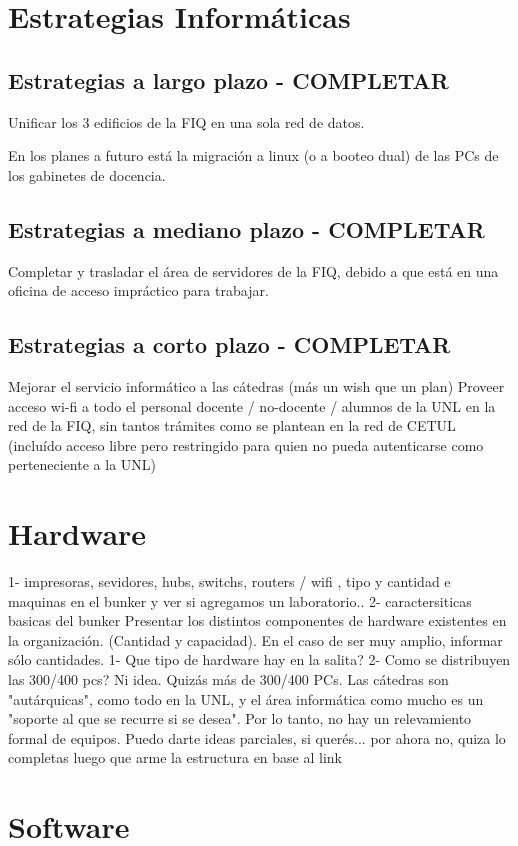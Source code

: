 \documentclass[10pt,a4paper,final]{article}
\begin{document}
\section{Estrategias Informáticas}
\subsection{Estrategias a largo plazo - COMPLETAR}
Unificar los 3 edificios de la FIQ en una sola red de datos.

En los planes a futuro está la migración a linux (o a booteo dual) de las PCs de los gabinetes de docencia.
\subsection{Estrategias a mediano plazo - COMPLETAR}
Completar y trasladar el área de servidores de la FIQ, debido a que está en una oficina de acceso impráctico para trabajar.
\subsection{Estrategias a corto plazo - COMPLETAR}
Mejorar el servicio informático a las cátedras (más un wish que un plan)
Proveer acceso wi-fi a todo el personal docente / no-docente / alumnos de la UNL en la red de la FIQ, sin tantos trámites como se plantean en la red de CETUL (incluído acceso libre pero restringido para quien no pueda autenticarse como perteneciente a la UNL)

\section{Hardware}
1- impresoras, sevidores, hubs, switchs, routers / wifi , tipo y cantidad e maquinas en el bunker y ver si agregamos un laboratorio..
2- caractersiticas basicas del bunker
Presentar los distintos componentes de hardware existentes en la organización. (Cantidad y capacidad).
En el caso de ser muy amplio, informar sólo cantidades.
1- Que tipo de hardware hay en la salita?
2- Como se distribuyen las 300/400 pcs?
Ni idea. Quizás más de 300/400 PCs. Las cátedras son "autárquicas", como todo en la UNL, y el área informática como mucho es un "soporte al que se recurre si se desea". Por lo tanto, no hay un relevamiento formal de equipos.
Puedo darte ideas parciales, si querés...
por ahora no, quiza lo completas luego que arme la estructura en base al link

\section{Software}
\end{document}
